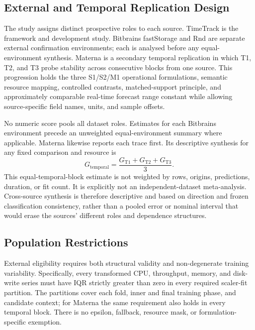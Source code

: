 \documentclass[a4paper,fleqn]{cas-dc}
\begin{document}
\subsection{External and Temporal Replication Design}
\label{sec:replication-design}

The study assigns distinct prospective roles to each source.  TimeTrack is the
framework and development study.  Bitbrains fastStorage and Rnd are separate
external confirmation environments; each is analysed before any
equal-environment synthesis.  Materna is a secondary temporal replication in
which T1, T2, and T3 probe stability across consecutive blocks from one source.
This progression holds the three S1/S2/M1 operational formulations, semantic resource mapping,
controlled contrasts, matched-support principle, and approximately comparable
real-time forecast range constant while allowing source-specific field names,
units, and sample offsets.

No numeric score pools all dataset roles.  Estimates for each Bitbrains
environment precede an unweighted equal-environment summary where applicable.
Materna likewise reports each trace first.  Its descriptive synthesis for any
fixed comparison and resource is
\begin{equation}
  G_{\mathrm{temporal}}
  = \frac{G_{\mathrm{T1}}+G_{\mathrm{T2}}+G_{\mathrm{T3}}}{3}.
  \label{eq:temporal-synthesis}
\end{equation}
This equal-temporal-block estimate is not weighted by rows, origins,
predictions, duration, or fit count.  It is explicitly not an
independent-dataset meta-analysis.  Cross-source synthesis is therefore
descriptive and based on direction and frozen classification consistency,
rather than a pooled error or nominal interval that would erase the sources'
different roles and dependence structures.

\subsection{Population Restrictions}
\label{sec:population-restrictions}

External eligibility requires both structural validity and non-degenerate
training variability.  Specifically, every transformed CPU, throughput,
memory, and disk-write series must have IQR strictly greater than zero in every
required scaler-fit partition.  The partitions cover each fold, inner and final
training phase, and candidate context; for Materna the same requirement also
holds in every temporal block.  There is no epsilon, fallback, resource mask,
or formulation-specific exemption.
\end{document}

